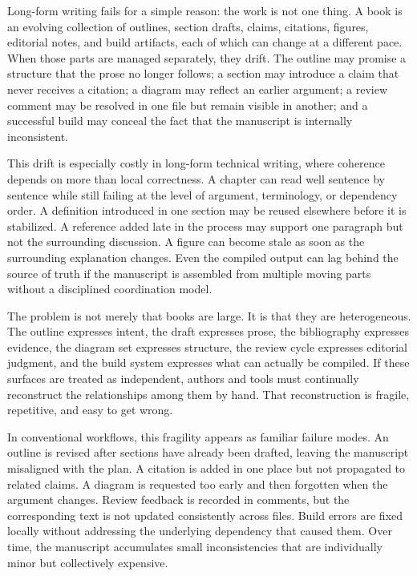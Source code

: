 Long-form writing fails for a simple reason: the work is not one thing. A book is an evolving collection of outlines, section drafts, claims, citations, figures, editorial notes, and build artifacts, each of which can change at a different pace. When those parts are managed separately, they drift. The outline may promise a structure that the prose no longer follows; a section may introduce a claim that never receives a citation; a diagram may reflect an earlier argument; a review comment may be resolved in one file but remain visible in another; and a successful build may conceal the fact that the manuscript is internally inconsistent.

This drift is especially costly in long-form technical writing, where coherence depends on more than local correctness. A chapter can read well sentence by sentence while still failing at the level of argument, terminology, or dependency order. A definition introduced in one section may be reused elsewhere before it is stabilized. A reference added late in the process may support one paragraph but not the surrounding discussion. A figure can become stale as soon as the surrounding explanation changes. Even the compiled output can lag behind the source of truth if the manuscript is assembled from multiple moving parts without a disciplined coordination model.

The problem is not merely that books are large. It is that they are heterogeneous. The outline expresses intent, the draft expresses prose, the bibliography expresses evidence, the diagram set expresses structure, the review cycle expresses editorial judgment, and the build system expresses what can actually be compiled. If these surfaces are treated as independent, authors and tools must continually reconstruct the relationships among them by hand. That reconstruction is fragile, repetitive, and easy to get wrong.

In conventional workflows, this fragility appears as familiar failure modes. An outline is revised after sections have already been drafted, leaving the manuscript misaligned with the plan. A citation is added in one place but not propagated to related claims. A diagram is requested too early and then forgotten when the argument changes. Review feedback is recorded in comments, but the corresponding text is not updated consistently across files. Build errors are fixed locally without addressing the underlying dependency that caused them. Over time, the manuscript accumulates small inconsistencies that are individually minor but collectively expensive.

